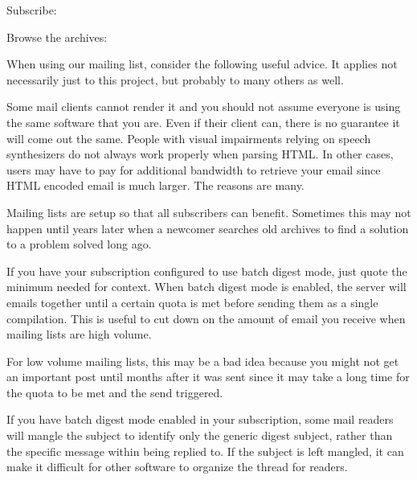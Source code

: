 \blank[2*big]
\startnarrower[3*left]
Subscribe:\crlf
{} 

\blank[2*big]
Browse the archives:\crlf
{}
\stopnarrower
\crlf

When using our mailing list, consider the following useful advice. It applies not necessarily just to this project, but probably to many others as well.

\startitemize[4]

Some mail clients cannot render it and you should not assume everyone is using the same software that you are. Even if their client can, there is no guarantee it will come out the same. People with visual impairments relying on speech synthesizers do not always work properly when parsing HTML. In other cases, users may have to pay for additional bandwidth to retrieve your email since HTML encoded email is much larger. The reasons are many.


Mailing lists are setup so that all subscribers can benefit. Sometimes this may not happen until years later when a newcomer searches old archives to find a solution to a problem solved long ago.


If you have your subscription configured to use batch digest mode, just quote the minimum needed for context. When batch digest mode is enabled, the server will  emails together until a certain quota is met before sending them as a single compilation. This is useful to cut down on the amount of email you receive when mailing lists are high volume. 

For low volume mailing lists, this may be a bad idea because you might not get an important post until months after it was sent since it may take a long time for the quota to be met and the send triggered.


If you have batch digest mode enabled in your subscription, some mail readers will mangle the subject to identify only the generic digest subject, rather than the specific message within being replied to. If the subject is left mangled, it can make it difficult for other software to organize the thread for readers.

